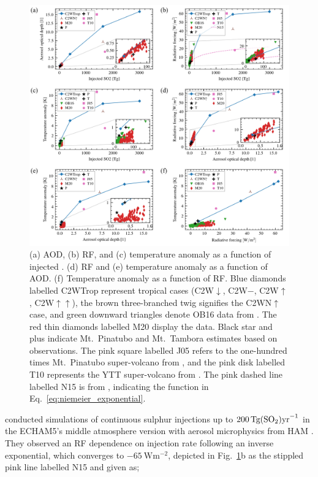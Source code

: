 \documentclass[draft]{agujournal2019}
\begin{document}
\begin{figure}
  \centering
  \includegraphics[width=\textwidth]{figures/figure4.png}

  \caption{(a) AOD, (b) RF, and (c) temperature anomaly as a function of injected
    \@. (d) RF and (e) temperature anomaly as a function of AOD. (f) Temperature
    anomaly as a function of RF. Blue diamonds labelled C2WTrop represent tropical cases
    (C2W\(\downarrow\), C2W\(-\), C2W\(\uparrow\), C2W\(\uparrow\uparrow\)), the brown
    three-branched twig signifies the C2WN\(\uparrow\) case, and green downward triangles
    denote OB16 data from . The red thin diamonds labelled M20
    display the  data. Black star and plus indicate Mt.\ Pinatubo
    and Mt.\ Tambora estimates based on observations. The pink square labelled J05 refers to
    the one-hundred times Mt.\ Pinatubo super-volcano from , and the pink
    disk labelled T10 represents the YTT super-volcano from . The pink
    dashed line labelled N15 is from , indicating the function in
    Eq.~\ref{eq:niemeier_exponential}.}\label{fig:4_parameter_scan}%
\end{figure}

 conducted simulations of continuous sulphur injections up to
\(\SI{200}{\tera\gram(\ce{SO2})\mathrm{yr}^{-1}}\) in the ECHAM5's middle atmosphere
version \cite{giorgetta2006} with aerosol microphysics from HAM \cite{stier2005}. They
observed an RF dependence on  injection rate following an inverse exponential,
which converges to \(\SI{-65}{\watt\meter^{-2}}\), depicted in
Fig.~\ref{fig:4_parameter_scan}b as the stippled pink line labelled N15 and given as;
\end{document}

